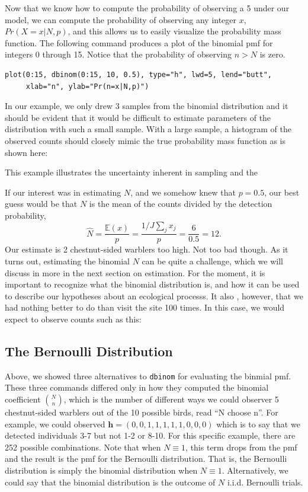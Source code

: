 Now that we know how to compute the probability of observing a 5 under
our model, we can compute the probability of observing any
integer $x$, $Pr(X=x|N,p)$, and this allows us to easily visualize the
probability mass function. The following command produces a plot of
the binomial pmf for integers 0 through 15. Notice that the
probability of observing $n>N$ is zero.

\begin{verbatim}
plot(0:15, dbinom(0:15, 10, 0.5), type="h", lwd=5, lend="butt",
     xlab="n", ylab="Pr(n=x|N,p)")
\end{verbatim}

In our example, we only drew 3 samples from the binomial distribution
and it should be evident that it would be difficult to estimate
parameters of the distribution with such a small sample. With a large
sample, a histogram of the observed counts should closely mimic the
true probability mass function as is shown here:


This
example illustrates the uncertainty inherent in sampling and the


If our interest was in estimating $N$, and we somehow
knew that $p=0.5$, our best guess would be that $N$ is the mean of the
counts divided by the detection probability,
\[
\hat{N} = \frac{\mathbb{E}(x)}{p} = \frac{1/J \sum_j x_j}{p} = \frac{6}{0.5} =
12.
\]
Our estimate is 2 chestnut-sided warblers too high. Not too bad
though. As it turns out, estimating the binomial $N$ can be quite a
challenge, which we will discuss in more in the next section on
estimation. For the moment, it is important to recognize what the
binomial distribution is, and how it can be used to describe our
hypotheses about an ecological processs. It also , however, that we had nothing better to do than
visit the site 100 times. In this case, we would expect to observe
counts such as this:




\subsection{The Bernoulli Distribution}

Above, we showed three alternatives to \verb+dbinom+ for evaluating the
binmial pmf. These three commands differed only in how they computed the binomial coefficient
$\binom{N}{n}$, which is the number of different ways
we could observer 5 chestnut-sided warblers out of the 10
possible birds, read ``N
choose n''. For example, we could observed $\mathbf{h}=(0,0,1,1,1,1,1,0,0,0)$
which is to say that we detected individuals 3-7 but not 1-2 or
8-10. For this specific example, there
are 252 possible combinations. Note that when $N \equiv 1$, this term
drops from the pmf and the result is the pmf for the Bernoulli
distribution. That is, the Bernoulli distribution is simply the
binomial distribution when $N \equiv 1$. Alternatively, we could say that the binomial
distribution is the outcome of $N$ i.i.d. Bernoulli trials.

